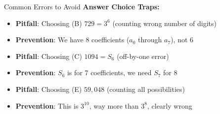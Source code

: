 \documentclass[12pt]{article}
\begin{document}
\begin{roadmapbox}
\begin{highlightbox}{Common Errors to Avoid}
\textbf{Answer Choice Traps:}
\begin{itemize}
    \item \textbf{Pitfall}: Choosing (B) $729 = 3^6$ (counting wrong number of digits)
    \item \textbf{Prevention}: We have 8 coefficients ($a_0$ through $a_7$), not 6
    
    \item \textbf{Pitfall}: Choosing (C) $1094 = S_6$ (off-by-one error)
    \item \textbf{Prevention}: $S_6$ is for 7 coefficients, we need $S_7$ for 8
    
    \item \textbf{Pitfall}: Choosing (E) $59,048$ (counting all possibilities)
    \item \textbf{Prevention}: This is $3^{10}$, way more than $3^8$, clearly wrong
\end{itemize}
\end{highlightbox}

\end{roadmapbox}
\end{document}
